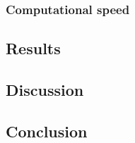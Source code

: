 \subsubsection{Computational speed}



\subsection{Results}

\subsection{Discussion}

\subsection{Conclusion}

